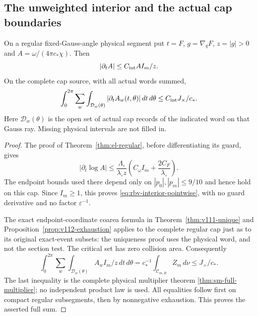 \subsection{The unweighted interior and the actual cap boundaries}

\begin{lemma}
\label{lem:rbv-interior}
On a regular fixed-Gauss-angle physical segment put
$t=F$, $g=\nabla_qF$, $z=|g|>0$ and
$A=\omega/(4\pi c_*\chi)$.  Then
\begin{equation}\label{eq:rbv-interior-pointwise}
       |\partial_t A|\le C_{\rm int} A I_m/z.
\end{equation}
On the complete cap source, with all actual words summed,
\begin{equation}\label{eq:rbv-interior-total}
 \int_0^{2\pi}\sum_w\int_{\mathcal D_w(\theta)}
                 |\partial_t A_w(t,\theta)|\,dt\,d\theta
                         \le C_{\rm int}J_\times/c_*.
\end{equation}
Here $\mathcal D_w(\theta)$ is the open set of actual cap records
of the indicated word on that Gauss ray.  Missing physical intervals
are not filled in.
\end{lemma}
\begin{proof}
The proof of Theorem~\ref{thm:el-regular}, before differentiating
its guard, gives
\[
 |\partial_t\log A|
 \le\frac{\Lambda_\circ}{\lambda_\circ z}
        \left(C_\omega I_m+\frac{2C_F}{\lambda_\circ}\right).
\]
The endpoint bounds used there depend only on
$|p_0|,|p_m|\le9/10$ and hence hold on this cap.  Since $I_m\ge1$,
this proves \eqref{eq:rbv-interior-pointwise}, with no guard
derivative and no factor $\varepsilon^{-1}$.

The exact endpoint-coordinate coarea formula in
Theorem~\ref{thm:v111-unique} and
Proposition~\ref{prop:v112-exhaustion} applies to the complete
regular cap just as to its original exact-event subsets: the
uniqueness proof uses the physical word, and not the section test.
The critical set has zero collision area.  Consequently
\[
 \int_0^{2\pi}\sum_w\int_{\mathcal D_w(\theta)}
                    A_w I_m/z\,dt\,d\theta
    =c_*^{-1}\int_{\mathcal C_{m,R}}Z_m\,d\nu
    \le J_\times/c_*.
\]
The last inequality is the complete physical multiplier theorem
\ref{thm:sm-full-multiplier}; no independent product law is used.
All equalities follow first on compact regular subsegments, then
by nonnegative exhaustion.  This proves the asserted full sum.
\end{proof}

